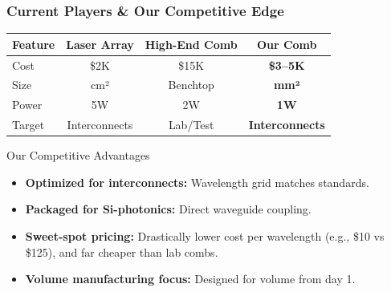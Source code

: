 \documentclass{beamer}
\begin{document}
\begin{frame}
    \frametitle{Current Players \& Our Competitive Edge}
    
    \begin{tabular}{l c c c}
        \toprule
        \textbf{Feature} & \textbf{Laser Array} & \textbf{High-End Comb} & \textbf{Our Comb} \\
        \midrule
        Cost & \$2K & \$15K & \textbf{\$3--5K} \\
        Size & cm² & Benchtop & \textbf{mm²} \\
        Power & 5W & 2W & \textbf{1W} \\
        Target & Interconnects & Lab/Test & \textbf{Interconnects} \\
        \bottomrule
    \end{tabular}
    
    \begin{block}{Our Competitive Advantages}
        \begin{itemize}
            \item \textbf{Optimized for interconnects:} Wavelength grid matches standards.
            \item \textbf{Packaged for Si-photonics:} Direct waveguide coupling.
            \item \textbf{Sweet-spot pricing:} Drastically lower cost per wavelength (e.g., \$10 vs \$125), and far cheaper than lab combs.
            \item \textbf{Volume manufacturing focus:} Designed for volume from day 1.
        \end{itemize}
    \end{block}
\end{frame}
\end{document}
